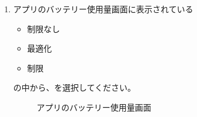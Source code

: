 \begin{enumerate}
        \newpage
        \item アプリのバッテリー使用量画面に表示されている
            \begin{itemize}
                \item 制限なし
                \item 最適化
                \item 制限
            \end{itemize}
            の中から、を選択してください。
            \begin{figure}[htbp]
                \centering
                \caption{アプリのバッテリー使用量画面}
                \label{img:battery3}
            \end{figure}
    \end{enumerate}